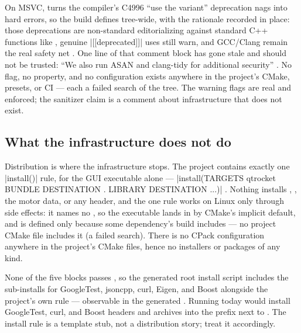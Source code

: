 On MSVC,  turns the compiler's C4996 ``use the  variant''
deprecation nags into hard errors, so the build defines
 tree-wide, with the rationale recorded in place:
those deprecations are non-standard editorializing against standard C++ functions like
, genuine \cppinline|[[deprecated]]| uses still warn, and GCC/Clang
remain the real safety net . One line of that comment block has
gone stale and should not be trusted: ``We also run ASAN and clang-tidy for additional
security'' . No  flag, no 
property, and no  configuration exists anywhere in the project's
CMake, presets, or CI --- each a failed search of the tree. The warning flags are real
and enforced; the sanitizer claim is a comment about infrastructure that does not
exist.

\subsection{What the infrastructure does not do}\label{sec:testing-absent}

Distribution is where the infrastructure stops. The project contains exactly one
\cppinline|install()| rule, for the GUI executable alone ---
\cppinline|install(TARGETS qtrocket BUNDLE DESTINATION . LIBRARY DESTINATION ...)|
. Nothing installs ,
, the motor data, or any header, and the one rule works on
Linux only through side effects: it names no , so the
executable lands in  by CMake's implicit default, and
 is defined only because some dependency's build includes
 --- no project CMake file includes it (a failed search). There is
no CPack configuration anywhere in the project's CMake files, hence no installers or
packages of any kind.

\begin{keyinsight}
None of the five  blocks passes 
, so the generated root install script includes the
 sub-installs for GoogleTest, jsoncpp, curl, Eigen, and Boost alongside the
project's own rule --- observable in the generated .
Running  today would install GoogleTest, curl, and Boost
headers and archives into the prefix next to . The install rule is a
template stub, not a distribution story; treat it accordingly.
\end{keyinsight}

